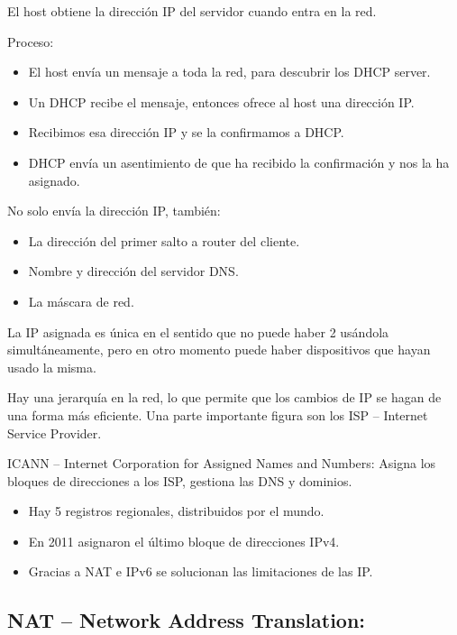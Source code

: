 \documentclass[12pt, twoside, openright]{report} %
\begin{document}
  El host obtiene la dirección IP del servidor cuando entra en la red.

  Proceso:

  \begin{itemize}
  \item
    El host envía un mensaje a toda la red, para descubrir los DHCP
    server.
  \item
    Un DHCP recibe el mensaje, entonces ofrece al host una dirección IP.
  \item
    Recibimos esa dirección IP y se la confirmamos a DHCP.
  \item
    DHCP envía un asentimiento de que ha recibido la confirmación y nos
    la ha asignado.
  \end{itemize}

  No solo envía la dirección IP, también:

  \begin{itemize}
  \item
    La dirección del primer salto a router del cliente.
  \item
    Nombre y dirección del servidor DNS.
  \item
    La máscara de red.
  \end{itemize}

  La IP asignada es única en el sentido que no puede haber 2 usándola
  simultáneamente, pero en otro momento puede haber dispositivos que
  hayan usado la misma.

  Hay una jerarquía en la red, lo que permite que los cambios de IP se
  hagan de una forma más eficiente. Una parte importante figura son los
  ISP -- Internet Service Provider.

  ICANN -- Internet Corporation for Assigned Names and Numbers: Asigna
  los bloques de direcciones a los ISP, gestiona las DNS y dominios.

  \begin{itemize}
  \item
    Hay 5 registros regionales, distribuidos por el mundo.
  \item
    En 2011 asignaron el último bloque de direcciones IPv4.
  \item Gracias a NAT e IPv6 se solucionan las limitaciones de las IP.
  \end{itemize}


\subsection{NAT -- Network Address
Translation:}
\end{document}
